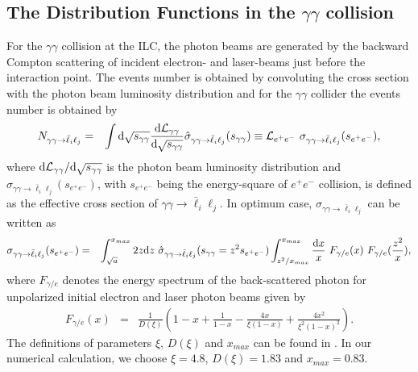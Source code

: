 \documentclass[preprint,aps,12pt,showpacs,nofootinbib,tightenlines]{revtex4}
\begin{document}
\subsection{The Distribution Functions in the $\gamma\gamma$ collision}
For the $\gamma \gamma$ collision at the ILC, the photon beams are
generated by the backward Compton scattering of incident electron-
and laser-beams just before the interaction point.  The events number
is obtained by convoluting the cross section with the photon beam
luminosity distribution and for the $\gamma \gamma$ collider the events
number is obtained by
\begin{eqnarray}
N_{\gamma \gamma \to   \bar \ell_i \ell_j}&=&\int  {\rm d}
\sqrt{s_{\gamma \gamma}} \frac{{\rm d}{\cal L}_{\gamma \gamma}}
{{\rm d} \sqrt{s_{\gamma \gamma}}} \hat{\sigma}_{\gamma \gamma \to
\bar \ell_i \ell_j} (s_{\gamma \gamma})\equiv {\cal L}_{e^+e^-}
~\sigma_{\gamma \gamma \to   \bar \ell_i \ell_j}(s_{e^+e^-}),
\label{definition}
\end{eqnarray}
where ${\rm d}{\cal L}_{\gamma \gamma}/{\rm d} \sqrt{s_{\gamma
\gamma}}$ is the photon beam luminosity distribution and
$\sigma_{\gamma \gamma \to   \bar \ell_i \ell_j}(s_{e^+e^-}) $, with
$s_{e^+e^-}$ being the energy-square of $e^+e^-$ collision, is
defined as the effective cross section of $ \gamma \gamma \to
\bar \ell_i \ell_j$. In optimum case, $\sigma_{\gamma \gamma \to
\bar \ell_i \ell_j} $ can be written as \cite{distribution}
\begin{eqnarray}
\sigma_{\gamma \gamma \to
\bar \ell_i \ell_j}(s_{e^+e^-})&=&\int_{\sqrt{a}}^{x_{max}} 2 z{\rm d}
z
 ~\hat{\sigma}_{\gamma \gamma \to   \bar \ell_i \ell_j} (s_{\gamma \gamma}=z^2 s_{e^+e^-})
\int_{z^2/x_{max}}^{x_{max}} \frac{{\rm d} x}{x}~F_{\gamma/e}(x)
~F_{\gamma/e}(\frac{z^2}{x}), \label{cross}
\end{eqnarray}
where $F_{\gamma/e}$ denotes the energy spectrum of the
back-scattered photon for unpolarized initial electron and laser
photon beams given by
\begin{eqnarray}
F_{\gamma/e}(x)&=&\frac{1}{D(\xi)} \left ( 1-x+\frac{1}{1-x}-\frac{4
x}{\xi (1-x)}+ \frac{4 x^2}{\xi^2 (1-x)^2} \right ).
\end{eqnarray}
The definitions of parameters $\xi$, $D(\xi)$ and $x_{max}$ can be
found in \cite{distribution}. In our numerical calculation, we
choose $\xi=4. 8$, $D(\xi)=1. 83$ and $x_{max}=0. 83$.
\end{document}
